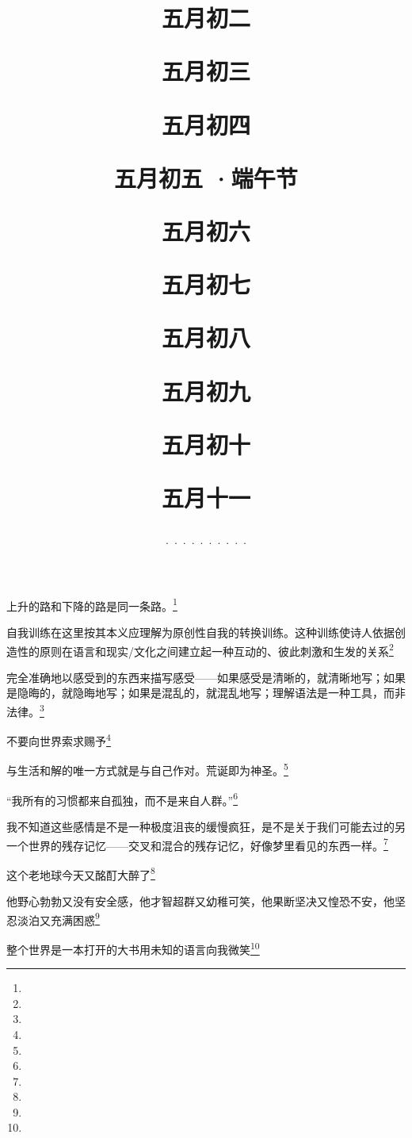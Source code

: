 \title{\date[d=7,m=6,y=2024][year:cn-y,年,month:cn,day:cn,日,·,weekday]·五月初二 }
上升的路和下降的路是同一条路。\footnote{ }

\title{\date[d=8,m=6,y=2024][year:cn-y,年,month:cn,day:cn,日,·,weekday]·五月初三 }
自我训练在这里按其本义应理解为原创性自我的转换训练。这种训练使诗人依据创造性的原则在语言和现实/文化之间建立起一种互动的、彼此刺激和生发的关系\footnote{ }

\title{\date[d=9,m=6,y=2024][year:cn-y,年,month:cn,day:cn,日,·,weekday]·五月初四 }
完全准确地以感受到的东西来描写感受——如果感受是清晰的，就清晰地写；如果是隐晦的，就隐晦地写；如果是混乱的，就混乱地写；理解语法是一种工具，而非法律。\footnote{ }

\title{\date[d=10,m=6,y=2024][year:cn-y,年,month:cn,day:cn,日,·,weekday]·五月初五 ·端午节}
不要向世界索求赐予\footnote{ }

\title{\date[d=11,m=6,y=2024][year:cn-y,年,month:cn,day:cn,日,·,weekday]·五月初六 }
与生活和解的唯一方式就是与自己作对。荒诞即为神圣。\footnote{ }

\title{\date[d=12,m=6,y=2024][year:cn-y,年,month:cn,day:cn,日,·,weekday]·五月初七 }
“我所有的习惯都来自孤独，而不是来自人群。”\footnote{ }

\title{\date[d=13,m=6,y=2024][year:cn-y,年,month:cn,day:cn,日,·,weekday]·五月初八 }
我不知道这些感情是不是一种极度沮丧的缓慢疯狂，是不是关于我们可能去过的另一个世界的残存记忆——交叉和混合的残存记忆，好像梦里看见的东西一样。\footnote{ }

\title{\date[d=14,m=6,y=2024][year:cn-y,年,month:cn,day:cn,日,·,weekday]·五月初九 }
这个老地球今天又酩酊大醉了\footnote{ }

\title{\date[d=15,m=6,y=2024][year:cn-y,年,month:cn,day:cn,日,·,weekday]·五月初十 }
他野心勃勃又没有安全感，他才智超群又幼稚可笑，他果断坚决又惶恐不安，他坚忍淡泊又充满困惑\footnote{ }

\title{\date[d=16,m=6,y=2024][year:cn-y,年,month:cn,day:cn,日,·,weekday]·五月十一 }
整个世界是一本打开的大书用未知的语言向我微笑\footnote{ }

